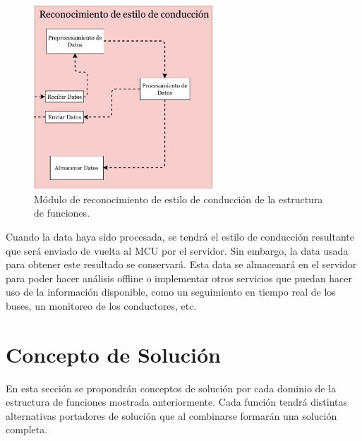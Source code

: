 \begin{figure}[htbp!]
\centering
\includegraphics[width=0.6\textwidth]{rec.pdf}
\caption{Módulo de reconocimiento de estilo de conducción de la estructura de funciones.}
\label{fig:3.7}
\end{figure}

Cuando la data haya sido procesada, se tendrá el estilo de conducción resultante que será enviado de vuelta al MCU por el servidor. Sin embargo, la data usada para obtener este resultado se conservará. Esta data se almacenará en el servidor para poder hacer análisis offline o implementar otros servicios que puedan hacer uso de la información disponible, como un seguimiento en tiempo real de los buses, un monitoreo de los conductores, etc.

\section{Concepto de Solución}
En esta sección se propondrán conceptos de solución por cada dominio de la estructura de funciones mostrada anteriormente. Cada función tendrá distintas alternativas portadores de solución que al combinarse formarán una solución completa.

